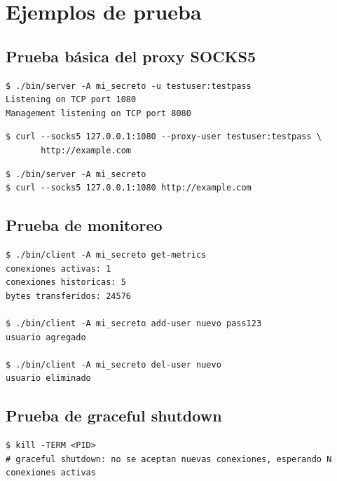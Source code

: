 \documentclass[12pt,a4paper]{article}
\begin{document}
\section{Ejemplos de prueba}

\subsection{Prueba básica del proxy SOCKS5}

\begin{lstlisting}[caption=Iniciar el servidor]
$ ./bin/server -A mi_secreto -u testuser:testpass
Listening on TCP port 1080
Management listening on TCP port 8080
\end{lstlisting}

\begin{lstlisting}[caption=Proxy con autenticación]
$ curl --socks5 127.0.0.1:1080 --proxy-user testuser:testpass \
       http://example.com
\end{lstlisting}

\begin{lstlisting}[caption=Proxy sin usuarios (NO AUTH)]
$ ./bin/server -A mi_secreto
$ curl --socks5 127.0.0.1:1080 http://example.com
\end{lstlisting}

\subsection{Prueba de monitoreo}

\begin{lstlisting}[caption=Métricas y usuarios en caliente]
$ ./bin/client -A mi_secreto get-metrics
conexiones activas: 1
conexiones historicas: 5
bytes transferidos: 24576

$ ./bin/client -A mi_secreto add-user nuevo pass123
usuario agregado

$ ./bin/client -A mi_secreto del-user nuevo
usuario eliminado
\end{lstlisting}

\subsection{Prueba de graceful shutdown}

\begin{lstlisting}[caption=SIGTERM]
$ kill -TERM <PID>
# graceful shutdown: no se aceptan nuevas conexiones, esperando N conexiones activas
\end{lstlisting}
\end{document}
